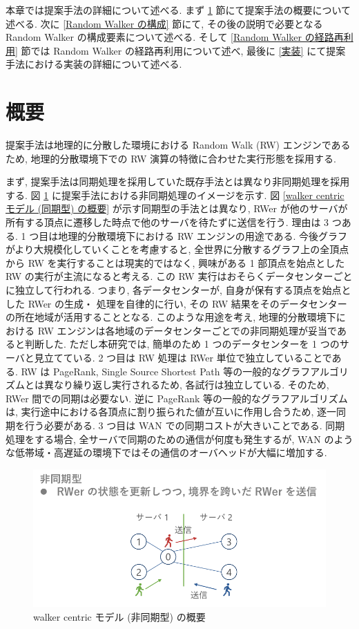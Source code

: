 本章では提案手法の詳細について述べる. まず \ref{概要} 節にて提案手法の概要について述べる. 次に \ref{Random Walker の構成} 節にて, その後の説明で必要となる Random Walker の構成要素について述べる. そして \ref{Random Walker の経路再利用} 節では Random Walker の経路再利用について述べ, 最後に \ref{実装} にて提案手法における実装の詳細について述べる. 

\section{概要}\label{概要}

提案手法は地理的に分散した環境における Random Walk (RW) エンジンであるため, 地理的分散環境下での RW 演算の特徴に合わせた実行形態を採用する. 

まず, 提案手法は同期処理を採用していた既存手法とは異なり非同期処理を採用する. 図 \ref{walker centric モデル (非同期型) の概要} に提案手法における非同期処理のイメージを示す. 図 \ref{walker centric モデル (同期型) の概要} が示す同期型の手法とは異なり, RWer が他のサーバが所有する頂点に遷移した時点で他のサーバを待たずに送信を行う. 理由は 3 つある. 
1 つ目は地理的分散環境下における RW エンジンの用途である. 今後グラフがより大規模化していくことを考慮すると, 全世界に分散するグラフ上の全頂点から RW を実行することは現実的ではなく, 興味がある 1 部頂点を始点とした RW の実行が主流になると考える. この RW 実行はおそらくデータセンターごとに独立して行われる. つまり, 各データセンターが, 自身が保有する頂点を始点とした RWer の生成・ 処理を自律的に行い, その RW 結果をそのデータセンターの所在地域が活用することとなる. このような用途を考え, 地理的分散環境下における RW エンジンは各地域のデータセンターごとでの非同期処理が妥当であると判断した. ただし本研究では, 簡単のため 1 つのデータセンターを 1 つのサーバと見立てている. 
2 つ目は RW 処理は RWer 単位で独立していることである. RW は PageRank, Single Source Shortest Path 等の一般的なグラフアルゴリズムとは異なり繰り返し実行されるため, 各試行は独立している. そのため, RWer 間での同期は必要ない. 逆に PageRank 等の一般的なグラフアルゴリズムは, 実行途中における各頂点に割り振られた値が互いに作用し合うため, 逐一同期を行う必要がある. 
3 つ目は WAN での同期コストが大きいことである. 同期処理をする場合, 全サーバで同期のための通信が何度も発生するが, WAN のような低帯域・高遅延の環境下ではその通信のオーバヘッドが大幅に増加する. 

\begin{figure}[t]
    \centering
    \includegraphics[scale=0.8]{figure/walkercentric_async.pdf}
    \caption{walker centric モデル (非同期型) の概要}
    \label{walker centric モデル (非同期型) の概要}
\end{figure}

